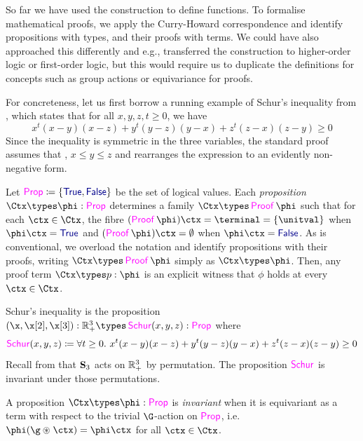 So far we have used the \WLOG{} construction to define functions. To
formalise mathematical proofs, we apply the Curry-Howard
correspondence and identify propositions with types, and their proofs
with terms. We could have also approached this differently and e.g.,
transferred the \WLOG{} construction to higher-order logic or
first-order logic, but this would require us to duplicate the
definitions for concepts such as group actions or equivariance for
proofs.

For concreteness, let us first borrow a running example of Schur's
inequality from \citet{DBLP:conf/tphol/Harrison09}, which states that
for all $x, y, z, t \ge 0$, we have
\[
  x^{t}(x - y)(x - z)+y^{t}(y - z)(y - x)+z^{t}(z - x)(z - y) \ge 0
\]
Since the inequality is symmetric in the three variables, the standard
proof assumes that \WLOG, $x \le y \le z$ and rearranges the
expression to an evidently non-negative form.

Let $\Prop \definedby \set{\Tru,\Fls}$ be the set of logical values.
Each \emph{proposition} $\Ctx \types \phi : \Prop$ determines a family
$\Ctx \types \Type{Proof} \phi$ such that for each $\ctx \in \Ctx$,
the fibre $(\Type{Proof} \phi) \ctx = \terminal = \set{\unitval}$ when
$\phi\ctx = \Tru$ and $(\Type{Proof} \phi) \ctx = \emptyset$ when
$\phi\ctx = \Fls$. As is conventional, we overload the notation and
identify propositions with their proofs, writing $\Ctx \types
\Type{Proof} \phi$ simply as $\Ctx \types \phi$. Then, any proof term
$\Ctx \types p : \phi$ is an explicit witness that $\phi$ holds at
every $\ctx \in \Ctx$.

\begin{example}
  Schur's inequality is the proposition $(\x, \y, \z) :
  \preals^3 \types \Type{Schur}(x, y, z) : \Prop$ where
  \[
    \Type{Schur}(x, y,z) \definedby \forall t \ge 0.\
    x^{t}(x-y)(x-z)+y^{t}(y-z)(y-x)+z^{t}(z-x)(z-y) \ge 0
  \]
  Recall from  that $\mathbf{S}_{3}$ acts
  on $\mathbb{R}_+^3$ by permutation. The proposition $\Type{Schur}$ is
  invariant under those permutations.
\end{example}

\begin{definition}
  A proposition $\Ctx \types \phi : \Prop$ is \emph{invariant} when it
  is equivariant as a term with respect to the trivial $\G$-action on
  $\Prop$, i.e. $\phi (\g \act \ctx) = \phi \ctx$ for all $\ctx \in
  \Ctx$.
\end{definition}

